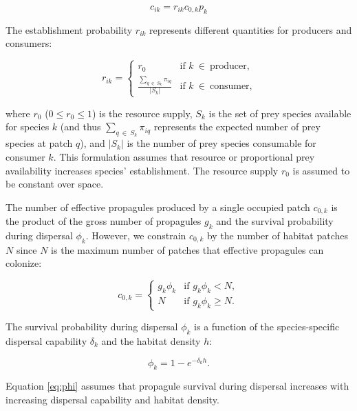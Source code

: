 \documentclass[11pt, class=article, crop=false]{standalone}
\begin{document}
\begin{equation}
     c_{ik} = r_{ik} c_{0, k} p_k
\end{equation}

The establishment probability $r_{ik}$ represents different quantities for producers and consumers:

\begin{equation}
    r_{ik} =
    \begin{cases}
    r_{0} & \text{if $k~\in~\text{producer}$,}\\
    \frac{\sum_{q~\in~S_k} \pi_{iq}}{|S_{k}|} & \text{if $k~\in~\text{consumer}$,}
    \end{cases}
    \label{eq:r-eq}
\end{equation}

where $r_0$ ($0 \le r_0 \le 1$) is the resource supply, $S_k$ is the set of prey species available for species $k$ (and thus $\sum_{q ~\in~S_k} \pi_{iq}$ represents the expected number of prey species at patch $q$), and $|S_{k}|$ is the number of prey species consumable for consumer $k$.
This formulation assumes that resource or proportional prey availability increases species' establishment.
The resource supply $r_0$ is assumed to be constant over space.

The number of effective propagules produced by a single occupied patch $c_{0, k}$ is the product of the gross number of propagules $g_{k}$ and the survival probability during dispersal $\phi_k$.
However, we constrain $c_{0, k}$ by the number of habitat patches $N$ since $N$ is the maximum number of patches that effective propagules can colonize:

\begin{equation}
    c_{0, k} = 
    \begin{cases}
        g_k \phi_k & \text{if $g_k \phi_k < N$},\\
        N & \text{if $g_k \phi_k \ge N$}.
    \end{cases}
    \label{eq:c0-prod}
\end{equation}

The survival probability during dispersal $\phi_k$ is a function of the species-specific dispersal capability $\delta_k$ and the habitat density $h$:

\begin{equation}
    \phi_k = 1 - e^{-\delta_k h}.
    \label{eq:phi}
\end{equation}

Equation \ref{eq:phi} assumes that propagule survival during dispersal increases with increasing dispersal capability and habitat density.
\end{document}
